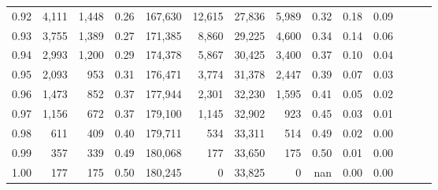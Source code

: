 \begin{tabular}{rrrrrrrrrrrrrr}
0.92 &  4,111 &  1,448 &  0.26 &  167,630 &   12,615 &  27,836 &   5,989 &  0.32 &  0.18 &      0.09 \\
0.93 &  3,755 &  1,389 &  0.27 &  171,385 &    8,860 &  29,225 &   4,600 &  0.34 &  0.14 &      0.06 \\
0.94 &  2,993 &  1,200 &  0.29 &  174,378 &    5,867 &  30,425 &   3,400 &  0.37 &  0.10 &      0.04 \\
0.95 &  2,093 &    953 &  0.31 &  176,471 &    3,774 &  31,378 &   2,447 &  0.39 &  0.07 &      0.03 \\
0.96 &  1,473 &    852 &  0.37 &  177,944 &    2,301 &  32,230 &   1,595 &  0.41 &  0.05 &      0.02 \\
0.97 &  1,156 &    672 &  0.37 &  179,100 &    1,145 &  32,902 &     923 &  0.45 &  0.03 &      0.01 \\
0.98 &    611 &    409 &  0.40 &  179,711 &      534 &  33,311 &     514 &  0.49 &  0.02 &      0.00 \\
0.99 &    357 &    339 &  0.49 &  180,068 &      177 &  33,650 &     175 &  0.50 &  0.01 &      0.00 \\
1.00 &    177 &    175 &  0.50 &  180,245 &        0 &  33,825 &       0 &   nan &  0.00 &      0.00 \\
\bottomrule
\end{tabular}
